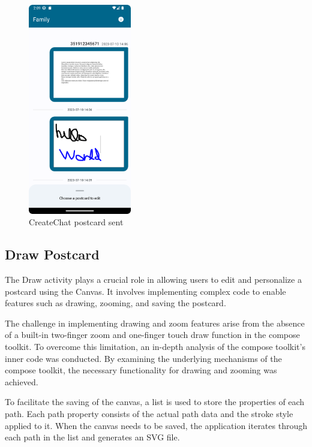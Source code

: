 \begin{figure}[!ht]
	\centering
	\includegraphics[trim={0cm -3cm 0 -3cm}, width=0.4\textwidth]{./Chapter6/Figures/ChatActivityUpdated}
	\caption{CreateChat postcard sent}
	\label{fig:CVA4}
\end{figure}



\subsection{Draw Postcard}
The Draw activity plays a crucial role in allowing users to edit and personalize a postcard using the Canvas. It involves implementing complex code to enable features such as drawing, zooming, and saving the postcard.

The challenge in implementing drawing and zoom features arise from the absence of a built-in two-finger zoom and one-finger touch draw function in the compose toolkit. To overcome this limitation, an in-depth analysis of the compose toolkit's inner code was conducted. By examining the underlying mechanisms of the compose toolkit, the necessary functionality for drawing and zooming was achieved.

To facilitate the saving of the canvas, a list is used to store the properties of each path. Each path property consists of the actual path data and the stroke style applied to it. When the canvas needs to be saved, the application iterates through each path in the list and generates an SVG file.


